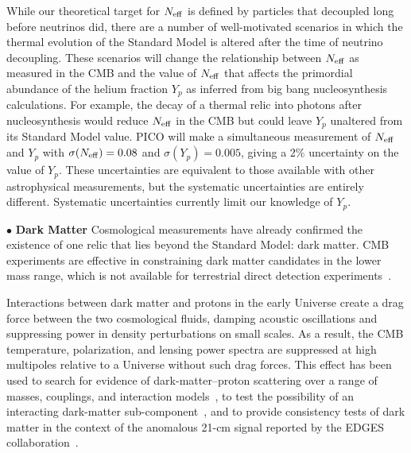 \documentclass[PICOReport.tex]{subfiles}
\begin{document}
While our theoretical target for ${N_{\rm eff}}$ is defined by particles that decoupled long before neutrinos did, there are a number of well-motivated scenarios in which the thermal evolution of the Standard Model is altered after the time of neutrino decoupling.  These scenarios will change the relationship between ${N_{\rm eff}}$ as measured in the CMB and the value of ${N_{\rm eff}}$ that affects the primordial abundance of the helium fraction $Y_p$ as inferred from big bang nucleosynthesis calculations. 
For example, the decay of a thermal relic into photons after nucleosynthesis would reduce ${N_{\rm eff}}$ in the CMB but could leave $Y_p$ unaltered from its Standard Model value.  PICO will make a simultaneous measurement of ${N_{\rm eff}}$ and $Y_p$ with $\sigma({N_{\rm eff}}) = 0.08$ and $\sigma(Y_p) =0.005$, giving a 2\% uncertainty on the value of $Y_p$. These uncertainties are equivalent to those available with other astrophysical measurements, but the systematic uncertainties are entirely different. Systematic uncertainties currently limit our knowledge of $Y_{p}$. 


\noindent$\bullet$ {\bf Dark Matter} \hspace{0.1in} Cosmological measurements have already confirmed the existence of one relic that lies beyond the Standard Model: dark matter. \ac{CMB} experiments are effective in constraining dark matter candidates in the lower mass range, which is not available for terrestrial direct detection experiments~\citep{Madhavacheril:2013cna,Green:2018pmd}. 

Interactions between dark matter and protons in the early Universe create a drag force between the two cosmological fluids, damping acoustic oscillations and suppressing power in density perturbations on small scales. As a result, the CMB temperature, polarization, and lensing power spectra are suppressed at high multipoles relative to a Universe without such drag forces.  This effect has been used to search for evidence of dark-matter--proton scattering over a range of masses, couplings, and interaction models~\citep{2002astro.ph..2496C, 2004PhRvD..70h3501S, Dvorkin:2013cea, 2018PhRvL.121h1301G,2018arXiv180108609B, 2018PhRvD..97j3530X, 2018arXiv180800001B, 2018PhRvD..98b3013S}, to test the possibility of an interacting dark-matter sub-component~\citep{2018arXiv180800001B}, and to provide consistency tests of dark matter in the context of the anomalous 21-cm signal reported by the EDGES collaboration~\citep{2018Natur.555...71B,2018Natur.555...67B,2018arXiv180800001B,2018arXiv180711482K}.
 
\end{document}
